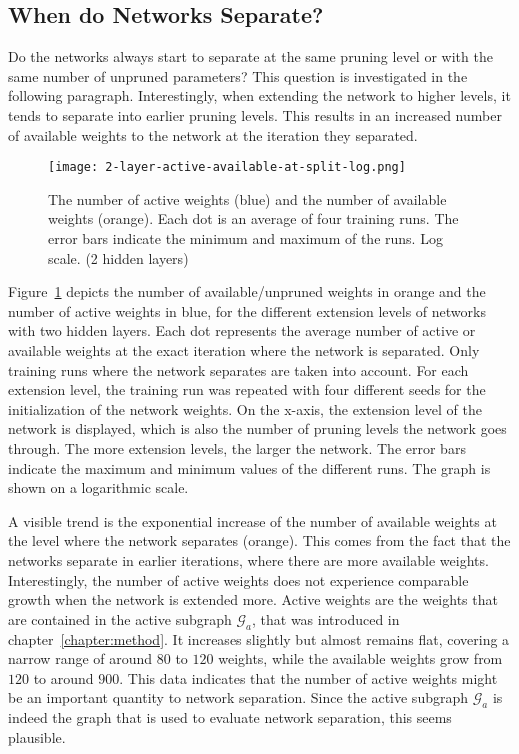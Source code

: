 \subsection{When do Networks Separate?}
Do the networks always start to separate at the same pruning level or with the same number of unpruned parameters?
This question is investigated in the following paragraph.
Interestingly, when extending the network to higher levels, it tends to separate into earlier pruning levels.
This results in an increased number of available weights to the network at the iteration they separated.
\begin{figure}[t] %
    \centering
    \texttt{[image: 2-layer-active-available-at-split-log.png]}
    \caption[Comparing active and available weights (2 hidden layers)]{
    The number of active weights (blue) and the number of available weights (orange).
    Each dot is an average of four training runs.
    The error bars indicate the minimum and maximum of the runs.
    Log scale. (2 hidden layers)
    }\label{fig:2l-active-split}
\end{figure}
Figure~\ref{fig:2l-active-split} depicts the number of available/unpruned weights in orange and the number of active weights in blue, for the different extension levels of networks with two hidden layers.
Each dot represents the average number of active or available weights at the exact iteration where the network is separated.
Only training runs where the network separates are taken into account.
For each extension level, the training run was repeated with four different seeds for the initialization of the network weights.
On the x-axis, the extension level of the network is displayed, which is also the number of pruning levels the network goes through.
The more extension levels, the larger the network.
The error bars indicate the maximum and minimum values of the different runs.
The graph is shown on a logarithmic scale.

A visible trend is the exponential increase of the number of available weights at the level where the network separates (orange).
This comes from the fact that the networks separate in earlier iterations, where there are more available weights.
Interestingly, the number of active weights does not experience comparable growth when the network is extended more.
Active weights are the weights that are contained in the active subgraph $\mathcal{G}_a$, that was introduced in chapter~\ref{chapter:method}.
It increases slightly but almost remains flat, covering a narrow range of around $80$ to $120$ weights, while the available weights grow from $120$ to around $900$.
This data indicates that the number of active weights might be an important quantity to network separation.
Since the active subgraph $\mathcal{G}_a$ is indeed the graph that is used to evaluate network separation, this seems plausible.
 
